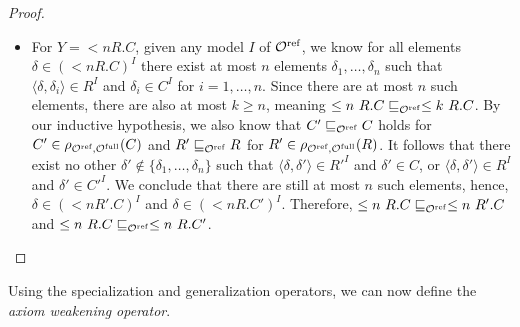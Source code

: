 \begin{proof}
\begin{itemize}
    \item For $Y ={} \less n R.C$, given any model $I$ of ${\mathcal{O}^\textnormal{ref}}$, we know for all elements $\delta \in (\less n R.C)^I$ there exist at most $n$ elements $\delta_1, \dots, \delta_n$ such that $\langle \delta, \delta_i \rangle \in R^I$ and $\delta_i \in C^I$ for $i = 1, \dots, n$. Since there are at most $n$ such elements, there are also at most $k \geq n$, meaning $\leq n~R.C \sqsubseteq_{\mathcal{O}^\textnormal{ref}} \leq k~R.C$. By our inductive hypothesis, we also know that $C' \sqsubseteq_{\mathcal{O}^\textnormal{ref}} C$ holds for $C' \in \rho_{{\mathcal{O}^\textnormal{ref}},{\mathcal{O}^\textnormal{full}}}(C)$ and $R' \sqsubseteq_{\mathcal{O}^\textnormal{ref}} R$ for $R' \in \rho_{{\mathcal{O}^\textnormal{ref}},{\mathcal{O}^\textnormal{full}}}(R)$. It follows that there exist no other $\delta' \not\in \{ \delta_1, \dots, \delta_n \}$ such that $\langle \delta, \delta' \rangle \in R'^I$ and $\delta' \in C$, or $\langle \delta, \delta' \rangle \in R^I$ and $\delta' \in C'^I$. We conclude that there are still at most $n$ such elements, hence, $\delta \in (\less n R'.C)^I$ and $\delta \in (\less n R.C')^I$. Therefore, $\leq n~R.C \sqsubseteq_{\mathcal{O}^\textnormal{ref}} \leq n~R'.C$ and $\leq n~R.C \sqsubseteq_{\mathcal{O}^\textnormal{ref}} \leq n~R.C'$.
  \end{itemize}
\end{proof}

Using the specialization and generalization operators, we can now define the \emph{axiom weakening operator}.

